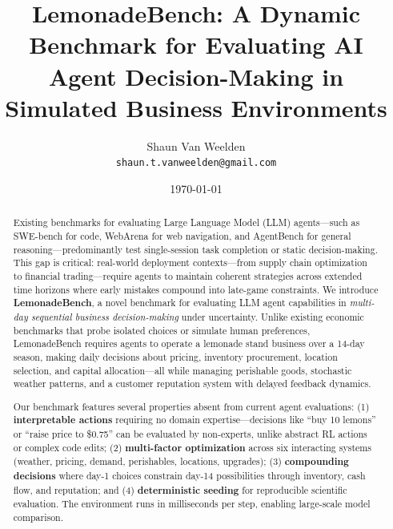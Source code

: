 \documentclass[11pt]{article}
\title{LemonadeBench: A Dynamic Benchmark for Evaluating AI Agent Decision-Making in Simulated Business Environments}
\author{
  Shaun Van Weelden \\
  \texttt{shaun.t.vanweelden@gmail.com}
}
\date{\today}
\begin{document}
\maketitle

\begin{abstract}
Existing benchmarks for evaluating Large Language Model (LLM) agents---such as SWE-bench for code, WebArena for web navigation, and AgentBench for general reasoning---predominantly test single-session task completion or static decision-making. This gap is critical: real-world deployment contexts---from supply chain optimization to financial trading---require agents to maintain coherent strategies across extended time horizons where early mistakes compound into late-game constraints. We introduce \textbf{LemonadeBench}, a novel benchmark for evaluating LLM agent capabilities in \emph{multi-day sequential business decision-making} under uncertainty. Unlike existing economic benchmarks that probe isolated choices or simulate human preferences, LemonadeBench requires agents to operate a lemonade stand business over a 14-day season, making daily decisions about pricing, inventory procurement, location selection, and capital allocation---all while managing perishable goods, stochastic weather patterns, and a customer reputation system with delayed feedback dynamics.

Our benchmark features several properties absent from current agent evaluations: (1) \textbf{interpretable actions} requiring no domain expertise---decisions like ``buy 10 lemons'' or ``raise price to \$0.75'' can be evaluated by non-experts, unlike abstract RL actions or complex code edits; (2) \textbf{multi-factor optimization} across six interacting systems (weather, pricing, demand, perishables, locations, upgrades); (3) \textbf{compounding decisions} where day-1 choices constrain day-14 possibilities through inventory, cash flow, and reputation; and (4) \textbf{deterministic seeding} for reproducible scientific evaluation. The environment runs in milliseconds per step, enabling large-scale model comparison.


\end{abstract}
\end{document}
